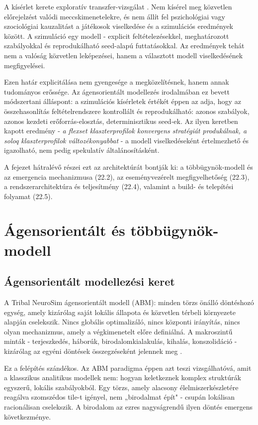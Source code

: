 ﻿\documentclass[a4paper,12pt]{report}
\begin{document}
A kísérlet kerete exploratív transzfer-vizsgálat \cite{bonabeau2002}.
Nem kísérel meg közvetlen előrejelzést valódi meccskimenetelekre, és nem állít fel
pszichológiai vagy szociológiai kauzalitást a játékosok viselkedése és a szimulációs eredmények között.
A szimuláció egy modell - explicit feltételezésekkel, meghatározott szabályokkal és reprodukálható
seed-alapú futtatásokkal. Az eredmények tehát nem a valóság közvetlen leképezései, hanem
a választott modell viselkedésének megfigyelései.

Ezen határ explicitálása nem gyengesége a megközelítésnek, hanem annak tudományos erőssége.
Az ágensorientált modellezés irodalmában ez bevett módszertani álláspont: a szimulációs kísérletek értékét
éppen az adja, hogy az összehasonlítás feltételrendszere kontrollált és reprodukálható: azonos
szabályok, azonos kezdeti erőforrás-elosztás, determinisztikus seed-ek.
Az ilyen keretben kapott eredmény - \textit{a flexset klaszterprofilok konvergens stratégiát produkálnak,
a soloq klaszterprofilok változékonyabbat} - a modell viselkedéseként értelmezhető és igazolható,
nem pedig spekulatív általánosításként.

A fejezet hátralévő részei ezt az architektúrát bontják ki: a többügynök-modell és az emergencia
mechanizmusa (22.2), az eseményvezérelt megfigyelhetőség (22.3), a rendszerarchitektúra és
teljesítmény (22.4), valamint a build- és telepítési folyamat (22.5).

\section{Ágensorientált és többügynök-modell}
\label{sec:neurosim-24-abm-mas}

\subsection*{Ágensorientált modellezési keret}

A Tribal NeuroSim ágensorientált modell (ABM): minden törzs önálló döntéshozó egység,
amely kizárólag saját lokális állapota és közvetlen térbeli környezete alapján cselekszik.
Nincs globális optimalizáló, nincs központi irányítás, nincs olyan mechanizmus,
amely a végkimenetelt előre definiálná. A makroszintű minták - terjeszkedés, háborúk,
birodalomkialakulás, kihalás, konszolidáció - kizárólag az egyéni döntések összegzéseként
jelennek meg \cite{bonabeau2002}.

Ez a felépítés szándékos. Az ABM paradigma éppen azt teszi vizsgálhatóvá,
amit a klasszikus analitikus modellek nem: hogyan keletkeznek komplex struktúrák
egyszerű, lokális szabályokból. Egy törzs, amely alacsony élelmiszerkészletére reagálva
szomszédos tile-t igényel, nem „birodalmat épít" - csupán lokálisan racionálisan cselekszik.
A birodalom az ezres nagyságrendű ilyen döntés emergens következménye.
\end{document}
